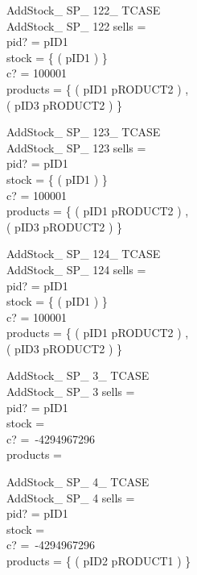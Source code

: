 \documentclass[fleqn,colorlinks,linkcolor=blue,citecolor=blue,urlcolor=blue]{article}
\newcommand{\negate}[0]{-}
\begin{document}
\begin{multicols}{2}
\begin{schema}{AddStock\_ SP\_ 122\_ TCASE}\\
 AddStock\_ SP\_ 122
\where
 sells =~\emptyset \\
 pid? = pID1 \\
 stock = \{ ( pID1  ) \} \\
 c? = 100001 \\
 products = \{ ( pID1 \mapsto pRODUCT2 ) , \\ ( pID3 \mapsto pRODUCT2 ) \}
\end{schema}


\begin{schema}{AddStock\_ SP\_ 123\_ TCASE}\\
 AddStock\_ SP\_ 123
\where
 sells =~\emptyset \\
 pid? = pID1 \\
 stock = \{ ( pID1  ) \} \\
 c? = 100001 \\
 products = \{ ( pID1 \mapsto pRODUCT2 ) , \\ ( pID3 \mapsto pRODUCT2 ) \}
\end{schema}


\begin{schema}{AddStock\_ SP\_ 124\_ TCASE}\\
 AddStock\_ SP\_ 124
\where
 sells =~\emptyset \\
 pid? = pID1 \\
 stock = \{ ( pID1  ) \} \\
 c? = 100001 \\
 products = \{ ( pID1 \mapsto pRODUCT2 ) , \\ ( pID3 \mapsto pRODUCT2 ) \}
\end{schema}


\begin{schema}{AddStock\_ SP\_ 3\_ TCASE}\\
 AddStock\_ SP\_ 3
\where
 sells =~\emptyset \\
 pid? = pID1 \\
 stock =~\emptyset \\
 c? =~\negate 4294967296 \\
 products =~\emptyset
\end{schema}


\begin{schema}{AddStock\_ SP\_ 4\_ TCASE}\\
 AddStock\_ SP\_ 4
\where
 sells =~\emptyset \\
 pid? = pID1 \\
 stock =~\emptyset \\
 c? =~\negate 4294967296 \\
 products = \{ ( pID2 \mapsto pRODUCT1 ) \}
\end{schema}



\end{multicols}
\end{document}
